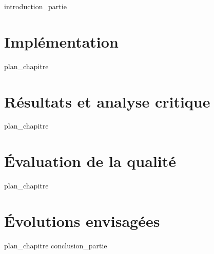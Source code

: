 \label{part:01_int}
{introduction_partie}
%
\chapter{Implémentation}
\label{chap:09}
{plan_chapitre}
%
\chapter{Résultats et analyse critique}
\label{chap:10}
{plan_chapitre}
%
\chapter{Évaluation de la qualité}
\label{chap:11}
{plan_chapitre}
%
\chapter{Évolutions envisagées}
\label{chap:12}
{plan_chapitre}
%
\label{part:01_cnc}
{conclusion_partie}
